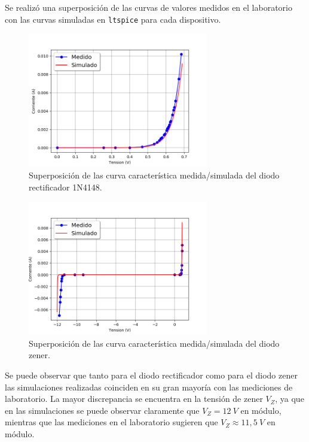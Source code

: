 \documentclass[a4paper]{article}
\begin{document}
Se realizó una superposición de las curvas de valores medidos en el laboratorio con las curvas simuladas en \texttt{ltspice} para cada dispositivo.

\begin{figure}[H]
	\centering
	\includegraphics[width=0.7\textwidth]{CurvaDiodoRectificador.png}
	\caption{Superposición de las curva característica medida/simulada del diodo rectificador 1N4148.}
	\label{fig:diodorect}
\end{figure}

\begin{figure}[H]
	\centering
	\includegraphics[width=0.7\textwidth]{CurvaZenerEntera.png}
	\caption{Superposición de las curva característica medida/simulada del diodo zener.}
	\label{fig:diodozen}
\end{figure}

Se puede observar que tanto para el diodo rectificador como para el diodo zener las simulaciones realizadas coinciden en su gran mayoría con las mediciones de laboratorio. La mayor discrepancia se encuentra en la tensión de zener $V_Z$, ya que en las simulaciones se puede observar claramente que $V_Z=12 \ V$ en módulo, mientras que las mediciones en el laboratorio sugieren que $V_Z \approx 11,5 \ V$ en módulo.
\end{document}
